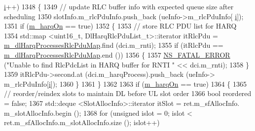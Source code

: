 \begin{DoxyCode}
      \hyperlink{bernuolliDistribution_8m_a6f6ccfcf58b31cb6412107d9d5281426}{i}++)
1348                         \{
1349                                 \textcolor{comment}{// update RLC buffer info with expected queue size after scheduling}
1350                                 slotInfo.m\_rlcPduInfo.push\_back (ueInfo->m\_rlcPduInfo[
      \hyperlink{bernuolliDistribution_8m_a6f6ccfcf58b31cb6412107d9d5281426}{i}]);
1351                                 \textcolor{keywordflow}{if} (\hyperlink{classns3_1_1MmWaveFlexTtiMaxRateMacScheduler_a43dee0cca8dce652c2a2dc750262708e}{m\_harqOn} == \textcolor{keyword}{true})
1352                                 \{
1353                                         \textcolor{comment}{// store RLC PDU list for HARQ}
1354                                         std::map <uint16\_t, DlHarqRlcPduList\_t>::iterator itRlcPdu =  
      \hyperlink{classns3_1_1MmWaveFlexTtiMaxRateMacScheduler_a5eeb7aeecc26d9849aadd3da24e00f68}{m\_dlHarqProcessesRlcPduMap}.find (dci.m\_rnti);
1355                                         \textcolor{keywordflow}{if} (itRlcPdu == 
      \hyperlink{classns3_1_1MmWaveFlexTtiMaxRateMacScheduler_a5eeb7aeecc26d9849aadd3da24e00f68}{m\_dlHarqProcessesRlcPduMap}.end ())
1356                                         \{
1357                                                 \hyperlink{group__fatal_ga5131d5e3f75d7d4cbfd706ac456fdc85}{NS\_FATAL\_ERROR} (\textcolor{stringliteral}{"Unable to find RlcPdcList in
       HARQ buffer for RNTI "} << dci.m\_rnti);
1358                                         \}
1359                                         itRlcPdu->second.at (dci.m\_harqProcess).push\_back (ueInfo->
      m\_rlcPduInfo[\hyperlink{bernuolliDistribution_8m_a6f6ccfcf58b31cb6412107d9d5281426}{i}]);
1360                                 \}
1361                         \}
1362 
1363                         \textcolor{keywordflow}{if} (\hyperlink{classns3_1_1MmWaveFlexTtiMaxRateMacScheduler_a43dee0cca8dce652c2a2dc750262708e}{m\_harqOn} == \textcolor{keyword}{true})
1364                         \{
1365                                 \textcolor{comment}{// reorder/reindex slots to maintain DL before UL slot order}
1366                                 \textcolor{keywordtype}{bool} reordered = \textcolor{keyword}{false};
1367                                 std::deque <SlotAllocInfo>::iterator itSlot = ret.m\_sfAllocInfo.
      m\_slotAllocInfo.begin ();
1368                                 \textcolor{keywordflow}{for} (\textcolor{keywordtype}{unsigned} islot = 0; islot < ret.m\_sfAllocInfo.m\_slotAllocInfo.size ();
       islot++)

\end{DoxyCode}
